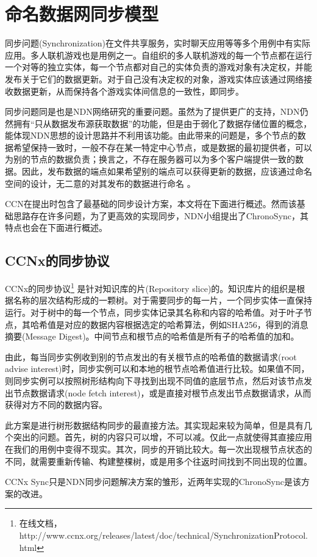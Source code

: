 \section{命名数据网同步模型}
\par
同步问题(Synchronization)在文件共享服务，实时聊天应用等等多个用例中有实际应用。多人联机游戏也是用例之一。自组织的多人联机游戏的每一个节点都在运行一个对等的独立实体，每一个节点都对自己的实体负责的游戏对象有决定权，并能发布关于它们的数据更新。对于自己没有决定权的对象，游戏实体应该通过网络接收数据更新，从而保持各个游戏实体间信息的一致性，即同步。
\par
同步问题同是也是NDN网络研究的重要问题。虽然为了提供更广的支持，NDN仍然拥有“只从数据发布源获取数据”的功能，但是由于弱化了数据存储位置的概念，能体现NDN思想的设计思路并不利用该功能。由此带来的问题是，多个节点的数据希望保持一致时，一般不存在某一特定中心节点，或是数据的最初提供者，可以为别的节点的数据负责；换言之，不存在服务器可以为多个客户端提供一致的数据。因此，发布数据的端点如果希望别的端点可以获得更新的数据，应该通过命名空间的设计，无二意的对其发布的数据进行命名 。
\par
CCN在提出时包含了最基础的同步设计方案，本文将在下面进行概述。然而该基础思路存在许多问题，为了更高效的实现同步，NDN小组提出了ChronoSync\cite{ChronosRef}，其特点也会在下面进行概述。
\subsection{CCNx的同步协议}
\par
CCNx的同步协议\footnote{在线文档，http://www.ccnx.org/releases/latest/doc/technical/SynchronizationProtocol.html}
是针对知识库的片(Repository slice)的。知识库片的组织是根据名称的层次结构形成的一颗树。对于需要同步的每一片，一个同步实体一直保持运行。对于树中的每一个节点，同步实体记录其名称和内容的哈希值。对于叶子节点，其哈希值是对应的数据内容根据选定的哈希算法，例如SHA256，得到的消息摘要(Message Digest)。中间节点和根节点的哈希值是所有子的哈希值的加和。
\par
由此，每当同步实例收到别的节点发出的有关根节点的哈希值的数据请求(root advise interest)时，同步实例可以和本地的根节点哈希值进行比较。如果值不同，则同步实例可以按照树形结构向下寻找到出现不同值的底层节点，然后对该节点发出节点数据请求(node fetch interest)，或是直接对根节点发出节点数据请求，从而获得对方不同的数据内容。
\par
此方案是进行树形数据结构同步的最直接方法。其实现起来较为简单，但是具有几个突出的问题。首先，树的内容只可以增，不可以减。仅此一点就使得其直接应用在我们的用例中变得不现实。其次，同步的开销比较大。每一次出现根节点状态的不同，就需要重新传输、构建整棵树，或是用多个往返时间找到不同出现的位置。
\par
CCNx  Sync只是NDN同步问题解决方案的雏形，近两年实现的ChronoSync是该方案的改进。
